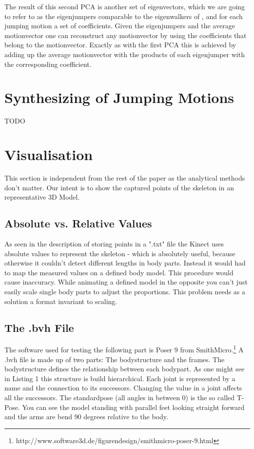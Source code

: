 \documentclass[a4paper]{article}
\begin{document}
The result of this second PCA is another set of eigenvectors, which we are going to refer to as the eigenjumpers comparable to the eigenwalkers of \cite{origin}, and for each jumping motion a set of coefficients.
Given the eigenjumpers and the average motionvector one can reconstruct any motionvector by using the coefficients that belong to the motionvector.
Exactly as with the first PCA this is achieved by adding up the average motionvector with the products of each eigenjumper with the corresponding coefficient.

\section{Synthesizing of Jumping Motions}

TODO

\section{Visualisation}

This section is independent from the rest of the paper as the analytical methods don't matter.
Our intent is to show the captured points of the skeleton in an representative 3D Model.

\subsection{Absolute vs. Relative Values}

As seen in the description of storing points in a ".txt" file the Kinect uses absolute values to represent the skeleton  - which is absolutely useful, because otherwise it couldn't detect different lengths in body parts.
Instead it would had to map the measured values on a defined body model.
This procedure would cause inaccuracy.
While animating a defined model in the opposite you can't just easily scale single body parts to adjust the proportions.
This problem needs as a solution a format invariant to scaling.

\subsection{The .bvh File}

The software used for testing the following part is Poser 9 from SmithMicro.\footnote{http://www.software3d.de/figurendesign/smithmicro-poser-9.html}
A .bvh file is made up of two parts: The bodystructure and the frames.
The bodystructure defines the relationship between each bodypart.
As one might see in Listing 1 this structure is build hierarchical.
Each joint is represented by a name and the connection to its successors.
Changing the value in a joint affects all the successors. 
The standardpose (all angles in between 0) is the so called T-Pose.
You can see the model standing with parallel feet looking straight forward and the arms are bend 90 degrees relative to the body.
\end{document}
